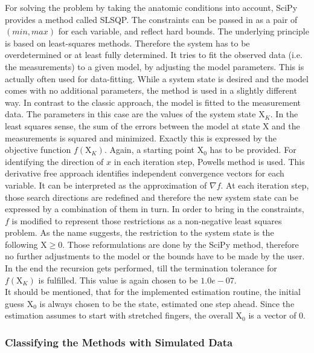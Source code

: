 For solving the problem by taking the anatomic conditions into account, SciPy provides a method called \ac{SLSQP}. The constraints can be passed in as a pair of $ (min,max) $ for each variable, and reflect hard bounds. The underlying principle is based on least-squares methods. Therefore the system has to be overdetermined or at least fully determined. It tries to fit the observed data (i.e. the measurements) to a given model, by adjusting the model parameters. This is actually often used for data-fitting. While a system state is desired and the model comes with no additional parameters, the method is used in a slightly different way. In contrast to the classic approach, the model is fitted to the measurement data. The parameters in this case are the values of the system state $ \mathrm{X}_K $. In the least squares sense, the sum of the errors between the model at state $ \mathrm{X} $ and the measurements is squared and minimized. Exactly this is expressed by the objective function $ f(\mathrm{X}_K) $. Again, a starting point $ \mathrm{X}_{0} $ has to be provided. For identifying the direction of $ x $ in each iteration step, Powells method \cite{powell1964efficient} is used. This derivative free approach identifies independent convergence vectors for each variable. It can be interpreted as the approximation of $ \nabla f $. At each iteration step, those search directions are redefined and therefore the new system state can be expressed by a combination of them in turn. In order to bring in the constraints, $ f $ is modified to represent those restrictions as a non-negative least squares problem. As the name suggests, the restriction to the system state is the following $ \mathrm{X} \geq 0$. Those reformulations are done by the SciPy method, therefore no further adjustments to the model or the bounds have to be made by the user. In the end the recursion gets performed, till the termination tolerance for $ f(\mathrm{X}_K) $ is fulfilled. This value is again chosen to be $ 1.0e-07 $.\\
It should be mentioned, that for the implemented estimation routine, the initial guess $ \mathrm{X}_{0} $ is always chosen to be the state, estimated one step ahead. Since the estimation assumes to start with stretched fingers, the overall $ \mathrm{X}_{0} $ is a vector of 0.  


\subsubsection{Classifying the Methods with Simulated Data} \label{subsubsec:simEval}

